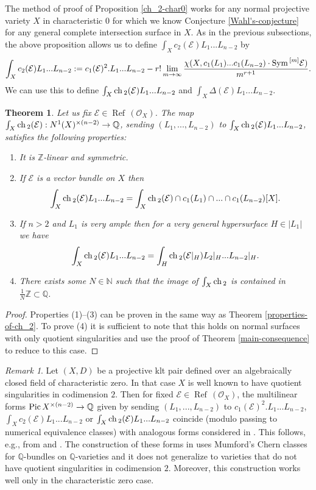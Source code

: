 \documentclass[twoside, 11pt]{article}
\theoremstyle{plain}
\newtheorem{Theorem}[Thm]{\sc Theorem}
\theoremstyle{definition}
\theoremstyle{remark}
\newtheorem{Remark}[Thm]{Remark}
\newcommand{\NN}{{\mathbb N}}
\newcommand{\ZZ}{{\mathbb Z}}
\newcommand{\QQ}{{\mathbb Q}}
\newcommand{\cE}{{\mathcal E}}
\newcommand{\cO}{{\mathcal O}}
\newcommand{\Pic}{{\mathop{\rm Pic \, }}}
\newcommand{\Refl}{{\mathop{\operatorname{Ref}\, }}}
\newcommand{\ch}{{\mathop{\rm ch \, }}}
\newcommand{\Sym}{{\mathop{{\rm Sym \, }}}}
\begin{document}
The method of proof of Proposition \ref{ch_2-char0}
works for any normal projective variety $X$ in characteristic $0$ for which we know Conjecture \ref{Wahl's-conjecture} for any general complete intersection surface in $X$.
As in the previous subsections, the above proposition allows us to define $\int _X c_2 (\cE)L_1...L_{n-2}$ by
$$\int _X c_2 (\cE)L_1...L_{n-2}:= c_1(\cE)^2.L_1...L_{n-2}-r!  \lim_{m\to \infty} \frac {  \chi (X, c_1(L_1)...c_1(L_{n-2}) \cdot {\Sym ^{[m]} \cE} ) }{m^{r+1}} . $$ 
We can use this to define  $\int _X \ch _2 (\cE)L_1...L_{n-2}$ and $\int _X \Delta (\cE)L_1...L_{n-2}$. 

\begin{Theorem}\label{properties-of-ch_2-char-0}
	Let us fix $\cE\in \Refl(\cO_X) $.
The map $\int_X\ch_2 (\cE): N^1( X) ^{\times (n-2)}\to \QQ$, sending $(L_1,..., L_{n-2})$ to $ \int _X \ch _2 (\cE)L_1...L_{n-2}$,
satisfies the following properties:
\begin{enumerate}
\item It is $\ZZ$-linear and symmetric.
\item If $\cE$ is a vector bundle on $X$ then $$\int _X \ch _2 (\cE)L_1...L_{n-2}=\int_X \ch _2 (\cE)\cap c_1(L_1)\cap ...\cap c_1(L_{n-2})[X].$$
\item If $n>2$ and  $ L_1$ is very ample then for a very general hypersurface $H\in |L_1|$ we have
$$\int _X \ch _2 (\cE)L_1...L_{n-2}=\int _{H}\ch_2 (\cE|_{H})L_2|_{H}...L_{n-2}|_{H}.$$
\item There exists some $N\in \NN$ such that the image of $\int_X\ch_2$ is contained in $\frac{1}{N}\ZZ\subset \QQ$.
\end{enumerate}
\end{Theorem}

\begin{proof}
Properties (1)--(3) can be proven in the same way as Theorem \ref{properties-of-ch_2}. To prove (4) it is sufficient to note that this holds on normal surfaces with only quotient singularities and use the proof of Theorem \ref{main-consequence} to reduce to this case.
\end{proof}

\medskip

\begin{Remark}
Let $(X,D)$ be a projective klt pair defined over an algebraically closed field of characteristic zero. In that case $X$ is well known to have quotient singularities in codimension $2$.  Then for fixed $\cE\in \Refl(\cO_X)$, the multilinear forms $\Pic X ^{\times(n-2)}\to \QQ$ given by sending $(L_1,...,L_{n-2})$ to
$c_1 (\cE)^2.L_1...L_{n-2}$, $\int _X c_2 (\cE)L_1...L_{n-2}$ or $\int _X \ch_2 (\cE)L_1...L_{n-2}$ coincide (modulo passing to numerical equivalence classes) with analogous forms considered in \cite[Theorem 3.13]{GKPT}.
This follows, e.g., from  \cite[Theorem 5.1]{La0}  and \cite[(3.13.2)]{GKPT}. The construction of these forms  in 
\cite{GKPT} uses Mumford's Chern classes for $\QQ$-bundles on $\QQ$-varieties and it does not generalize to varieties that do not have quotient singularities in codimension $2$. Moreover, this construction works well only in the characteristic zero case.
\end{Remark}
\end{document}
